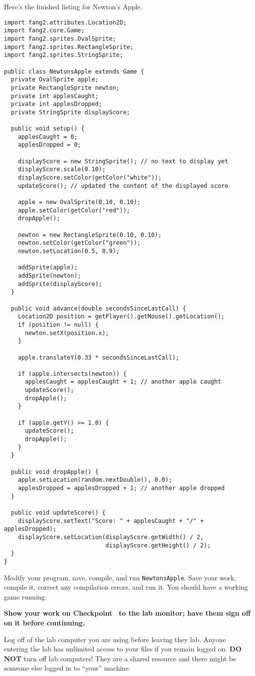 \documentclass[12pt,twoside]{memoir}
\begin{document}
\begin{Exercise}[name={Checkpoint},title={Finish \texttt{NewtonsApple}.}]
Here's the finished listing for Newton's Apple. 

\begin{lstlisting}
import fang2.attributes.Location2D;
import fang2.core.Game;
import fang2.sprites.OvalSprite;
import fang2.sprites.RectangleSprite;
import fang2.sprites.StringSprite;

public class NewtonsApple extends Game {
  private OvalSprite apple;
  private RectangleSprite newton;
  private int applesCaught;
  private int applesDropped;
  private StringSprite displayScore;

  public void setup() {
    applesCaught = 0;
    applesDropped = 0;

    displayScore = new StringSprite(); // no text to display yet
    displayScore.scale(0.10);
    displayScore.setColor(getColor("white"));
    updateScore(); // updated the content of the displayed score

    apple = new OvalSprite(0.10, 0.10);
    apple.setColor(getColor("red"));
    dropApple();

    newton = new RectangleSprite(0.10, 0.10);
    newton.setColor(getColor("green"));
    newton.setLocation(0.5, 0.9);

    addSprite(apple);
    addSprite(newton);
    addSprite(displayScore);
  }

  public void advance(double secondsSinceLastCall) {
    Location2D position = getPlayer().getMouse().getLocation();
    if (position != null) {
      newton.setX(position.x);
    }

    apple.translateY(0.33 * secondsSinceLastCall);

    if (apple.intersects(newton)) {
      applesCaught = applesCaught + 1; // another apple caught
      updateScore();
      dropApple();
    }

    if (apple.getY() >= 1.0) {
      updateScore();
      dropApple();
    }
  }

  public void dropApple() {
    apple.setLocation(random.nextDouble(), 0.0);
    applesDropped = applesDropped + 1; // another apple dropped
  }

  public void updateScore() {
    displayScore.setText("Score: " + applesCaught + "/" + applesDropped);
    displayScore.setLocation(displayScore.getWidth() / 2, 
                             displayScore.getHeight() / 2);
  }
}  
\end{lstlisting}

Modify your program, save, compile, and run \texttt{NewtonsApple}.
Save your work, compile it, correct any compilation errors, and run
it. You should have a working game running.
\end{Exercise}
\noindent
\textbf{Show your work on Checkpoint~\theExercise{} to the lab monitor;
  have them sign off on it before continuing.}

\Large{Log off of the lab computer you are using before leaving they
  lab. Anyone entering the lab has unlimited access to your files if
  you remain logged on. \textbf{DO NOT} turn off lab computers! They
  are a shared resource and there might be someone else logged in to
  ``your'' machine.}
\end{document}
